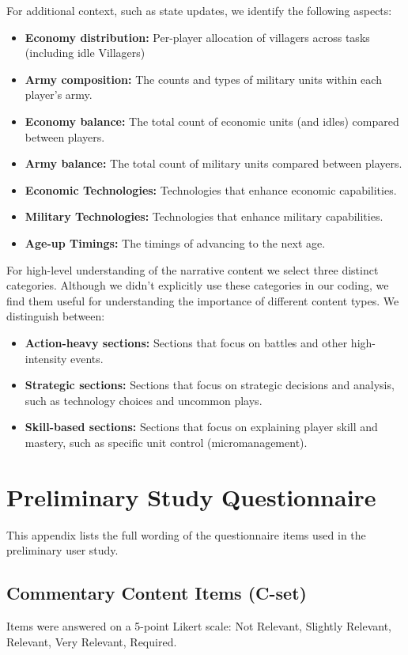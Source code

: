 For additional context, such as state updates, we identify the following aspects:
\begin{itemize}
  \item \textbf{Economy distribution:} Per-player allocation of villagers across tasks (including idle Villagers)
  \item \textbf{Army composition:} The counts and types of military units within each player's army.
  \item \textbf{Economy balance:} The total count of economic units (and idles) compared between players.
  \item \textbf{Army balance:} The total count of military units compared between players.
  \item \textbf{Economic Technologies:} Technologies that enhance economic capabilities.
  \item \textbf{Military Technologies:} Technologies that enhance military capabilities.
  \item \textbf{Age-up Timings:} The timings of advancing to the next age.
\end{itemize}

For high-level understanding of the narrative content we select three distinct categories. Although we didn't explicitly use these categories in our coding, we find them useful for understanding the importance of different content types. We distinguish between:
\begin{itemize}
  \item \textbf{Action-heavy sections:} Sections that focus on battles and other high-intensity events.
  \item \textbf{Strategic sections:} Sections that focus on strategic decisions and analysis, such as technology choices and uncommon plays.
  \item \textbf{Skill-based sections:} Sections that focus on explaining player skill and mastery, such as specific unit control (micromanagement).
\end{itemize}

\section{Preliminary Study Questionnaire}
\label{appendix:prelim-questionnaire}

This appendix lists the full wording of the questionnaire items used in the preliminary user study.

\subsection{Commentary Content Items (C-set)}
Items were answered on a 5-point Likert scale: Not Relevant, Slightly Relevant, Relevant, Very Relevant, Required.

